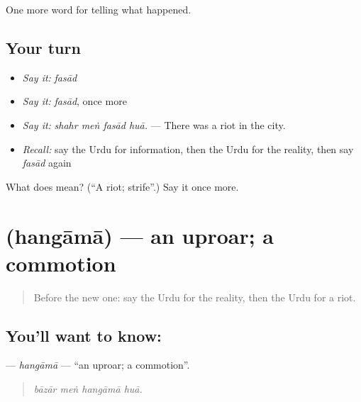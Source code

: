 \begin{grammarlens}[title={What you've built}]
One more word for telling what happened.
\end{grammarlens}

\subsection*{Your turn}
\begin{itemize}
\raggedright
  \item \emph{Say it:} \emph{fasād}
  \item \emph{Say it:} \emph{fasād}, once more
  \item \emph{Say it:} \emph{shahr meṅ fasād huā.} — There was a riot in the city.
  \item \emph{Recall:} say the Urdu for information, then the Urdu for the reality, then say \emph{fasād} again
\end{itemize}

\begin{tcolorbox}[breakable,colback=teal!4,colframe=teal!35!black,title={Before you move on}]
What does  mean? (\textquotedblleft{}A riot; strife\textquotedblright{}.) Say it once more.
\end{tcolorbox}
\section[\texorpdfstring{\ur{ہنگامہ} (hangāmā)}{ہنگامہ (hangāmā)}]{ (hangāmā) — an uproar; a commotion}

\label{lesson:UR-C304-hangama}



\begin{quote}
Before the new one: say the Urdu for the reality, then the Urdu for a riot.
\end{quote}

\subsection*{You'll want to know: }
\textbf{} — \emph{hangāmā} — \textquotedblleft{}an uproar; a commotion\textquotedblright{}.

\begin{quote}
   
\end{quote}

\begin{quote}
\emph{bāzār meṅ hangāmā huā.}
\end{quote}

